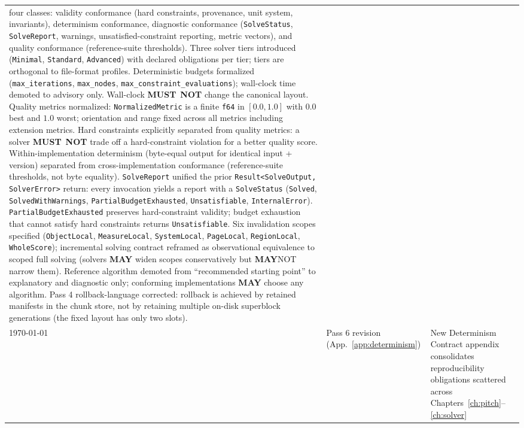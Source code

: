 \documentclass[11pt,letterpaper]{report}
\newcommand{\MUSTNOT}{\textbf{MUST}\nobreak\ \textbf{NOT}}
\newcommand{\MAY}{\textbf{MAY}}
\begin{document}
\begin{longtable}{p{2cm} p{2.5cm} p{9cm}}
  four classes: validity conformance (hard constraints, provenance,
  unit system, invariants), determinism conformance, diagnostic
  conformance (\texttt{SolveStatus}, \texttt{SolveReport}, warnings,
  unsatisfied-constraint reporting, metric vectors), and quality
  conformance (reference-suite thresholds). Three solver tiers
  introduced (\texttt{Minimal}, \texttt{Standard}, \texttt{Advanced})
  with declared obligations per tier; tiers are orthogonal to
  file-format profiles. Deterministic budgets formalized
  (\texttt{max\_iterations}, \texttt{max\_nodes},
  \texttt{max\_constraint\_evaluations}); wall-clock time demoted
  to advisory only. Wall-clock \MUSTNOT{} change the canonical
  layout. Quality metrics normalized: \texttt{NormalizedMetric} is
  a finite \texttt{f64} in $[0.0, 1.0]$ with $0.0$ best and $1.0$
  worst; orientation and range fixed across all metrics including
  extension metrics. Hard constraints explicitly separated from
  quality metrics: a solver \MUSTNOT{} trade off a hard-constraint
  violation for a better quality score. Within-implementation
  determinism (byte-equal output for identical input + version)
  separated from cross-implementation conformance (reference-suite
  thresholds, not byte equality). \texttt{SolveReport} unified the
  prior \texttt{Result<SolveOutput, SolverError>} return: every
  invocation yields a report with a \texttt{SolveStatus}
  (\texttt{Solved}, \texttt{SolvedWithWarnings},
  \texttt{PartialBudgetExhausted}, \texttt{Unsatisfiable},
  \texttt{InternalError}). \texttt{PartialBudgetExhausted}
  preserves hard-constraint validity; budget exhaustion that
  cannot satisfy hard constraints returns \texttt{Unsatisfiable}.
  Six invalidation scopes specified (\texttt{ObjectLocal},
  \texttt{MeasureLocal}, \texttt{SystemLocal}, \texttt{PageLocal},
  \texttt{RegionLocal}, \texttt{WholeScore}); incremental solving
  contract reframed as observational equivalence to scoped full
  solving (solvers \MAY{} widen scopes conservatively but
  \MAY NOT{} narrow them). Reference algorithm demoted from
  ``recommended starting point'' to explanatory and diagnostic
  only; conforming implementations \MAY{} choose any algorithm.
  Pass 4 rollback-language corrected: rollback is achieved by
  retained manifests in the chunk store, not by retaining multiple
  on-disk superblock generations (the fixed layout has only two
  slots). \\
  \today & Pass 6 revision (App.~\ref{app:determinism}) &
  New Determinism Contract appendix consolidates reproducibility
  obligations scattered across Chapters~\ref{ch:pitch}--\ref{ch:solver}

\end{longtable}
\end{document}

